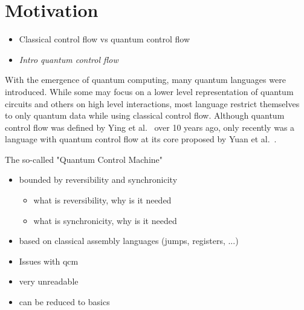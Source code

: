 \chapter{Motivation}
\begin{itemize}
    \item Classical control flow vs quantum control flow~\cite{YYF12}
    \item \emph{Intro quantum control flow}
\end{itemize}
With the emergence of quantum computing, many quantum languages were introduced. While some may focus on a lower level representation of quantum circuits and others on high level interactions, most language restrict themselves to only quantum data while using classical control flow. Although quantum control flow was defined by Ying et al.~\cite{YYF12} over 10 years ago, only recently was a language with quantum control flow at its core proposed by Yuan et al.~\cite{YVC24}. 

The so-called "Quantum Control Machine"  
\begin{itemize}
    \item bounded by reversibility and synchronicity
    \begin{itemize}
        \item what is reversibility, why is it needed
        \item what is synchronicity, why is it needed
    \end{itemize}
    \item based on classical assembly languages (jumps, registers, ...)
\end{itemize}

\begin{itemize}
    \item Issues with qcm
    \item very unreadable
    \item can be reduced to basics
\end{itemize}